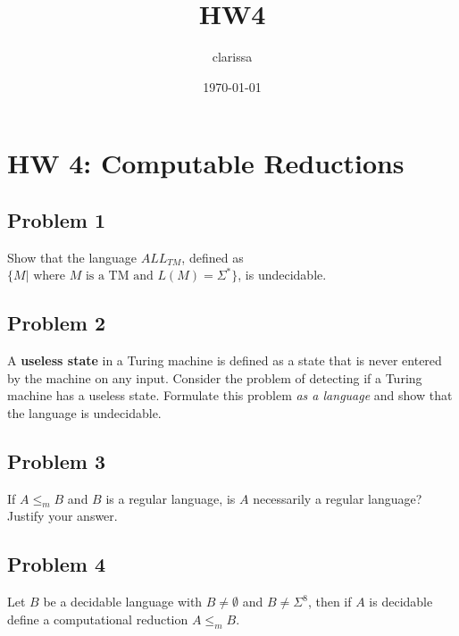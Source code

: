 \documentclass[11pt]{article}
\author{clarissa}
\date{\today}
\title{HW4}
\begin{document}
\maketitle
\tableofcontents

\section{HW 4: Computable Reductions}
\label{sec-1}
\subsection{Problem 1}
\label{sec-1-1}
Show that the language $ALL_{TM}$, defined as $\{M | \text{ where } M \text{ is a TM and } L(M) = \Sigma^*\}$, is undecidable.
\subsection{Problem 2}
\label{sec-1-2}
A \textbf{useless state} in a Turing machine is defined as a state that is never entered by the machine on any input. Consider the problem of detecting if a Turing machine has a useless state. Formulate this problem \emph{as a language} and show that the language is undecidable.
\subsection{Problem 3}
\label{sec-1-3}
If $A \le_m B$ and $B$ is a regular language, is $A$ necessarily a regular language? Justify your answer.
\subsection{Problem 4}
\label{sec-1-4}
Let $B$ be a decidable language with $B \neq \emptyset$ and $B \neq \Sigma^8$, then if $A$ is decidable define a computational reduction $A \le_m B$.
\end{document}
